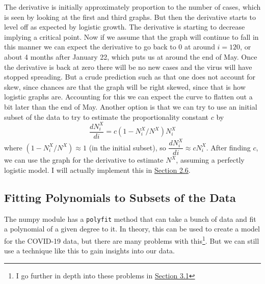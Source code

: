 \documentclass{report}
\begin{document}
            The derivative is initially approximately proportion to the number of cases, which is seen by looking at the first and third graphs. But then the derivative starts to level off as expected by logistic growth. The derivative is starting to decrease implying a critical point. Now if we assume that the graph will continue to fall in this manner we can expect the derivative to go back to 0 at around $i=120$, or about 4 months after January 22, which puts us at around the end of May. Once the derivative is back at zero there will be no new cases and the virus will have stopped spreading. But a crude prediction such as that one does not account for skew, since chances are that the graph will be right skewed, since that is how logistic graphs are. Accounting for this we can expect the curve to flatten out a bit later than the end of May. 
            \newline
            \indent Another option is that we can try to use an initial subset of the data to try to estimate the proportionality constant $c$ by
            \begin{equation}
                \dfrac{dN^X_i}{di} = c(1 - N^X_i/N^X)N^X_i
            \end{equation}
            where $(1 - N^X_i/N^X) \approx 1$ (in the initial subset), so $\dfrac{dN^X_i}{di} \approx cN^X_i$. After finding $c$, we can use the graph for the derivative to estimate $N^X$, assuming a perfectly logistic model. I will actually implement this in \hyperref[sec:auto]{Section 2.6}.
        \subsection{Fitting Polynomials to Subsets of the Data}
        \label{sec:polys}
            The numpy module has a \lstinline{polyfit} method that can take a bunch of data and fit a polynomial of a given degree to it. In theory, this can be used to create a model for the COVID-19 data, but there are many problems with this\footnote{I go further in depth into these problems in \hyperref[sec:problems]{Section 3.1}}. But we can still use a technique like this to gain insights into our data.
\end{document}
